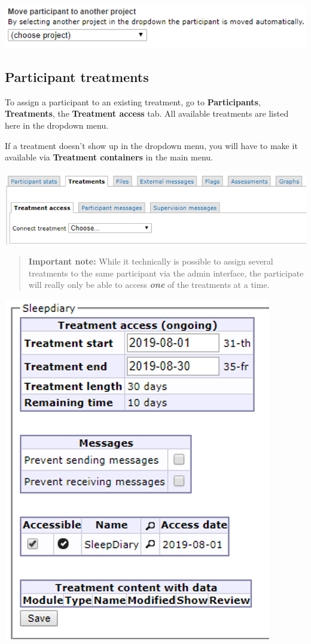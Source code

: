 \documentclass[]{book}
\begin{document}
\includegraphics{images/new-images/participantMoveProject.png}

\hypertarget{participant-treatments}{%
\subsection{Participant treatments}\label{participant-treatments}}

To assign a participant to an existing treatment, go to \textbf{Participants}, \textbf{Treatments}, the \textbf{Treatment access} tab. All available treatments are listed here in the dropdown menu.

If a treatment doesn't show up in the dropdown menu, you will have to make it available via \textbf{Treatment containers} in the main menu.

\includegraphics{images/new-images/participantTreatConnect.png}

\begin{quote}
\textbf{Important note:} While it technically is possible to assign several treatments to the same participant via the admin interface, the participate will really only be able to access \emph{\textbf{one}} of the treatments at a time.
\end{quote}

\includegraphics{images/new-images/participantTreatAccess.png}
\end{document}
